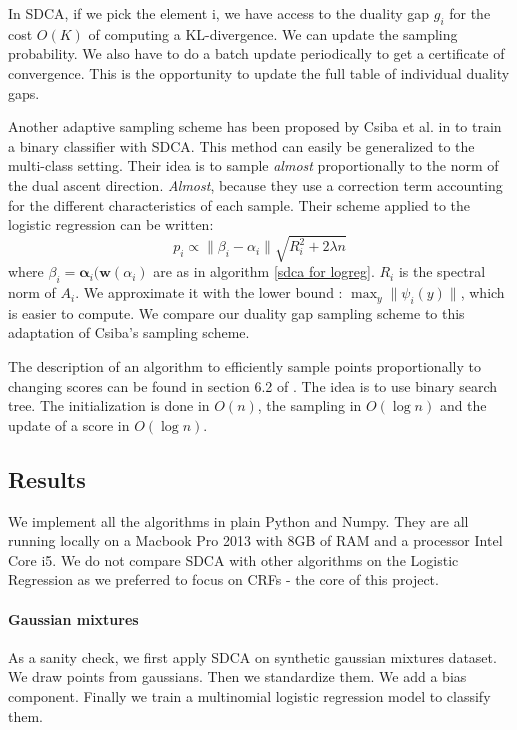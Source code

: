 \documentclass{article}
\DeclareMathOperator{\1}{\mathbb{1}}
\begin{document}
In SDCA, if we pick the element i, we have access to the duality gap $g_i$ for the cost $O(K)$ of computing a KL-divergence.
We can update the sampling probability.
We also have to do a batch update periodically to get a certificate of convergence.
This is the opportunity to update the full table of individual duality gaps.

Another adaptive sampling scheme has been proposed by Csiba et al.  in \cite{csiba_stochastic_2015} to train a binary classifier with SDCA.
This method can easily be generalized to the multi-class setting.
Their idea is to sample \textit{almost} proportionally to the norm of the dual ascent direction.
\textit{Almost}, because they use a correction term accounting for the different characteristics of each sample.
Their scheme applied to the logistic regression can be written:
\begin{equation}
	\label{csiba}
	p_i \propto \| \beta_i - \alpha_i \| \sqrt{R_i^2 + 2 \lambda n} 
\end{equation}
where $\beta_i = \bm \alpha_i(\bm w(\alpha_i)$ are as in algorithm \ref{sdca for logreg}. 
$R_i$ is the spectral norm of $A_i$.
We approximate it with the lower bound : $\max_y \| \psi_i(y)\|$, which is easier to compute.
We compare our duality gap sampling scheme to this adaptation of Csiba's sampling scheme.

The description of an algorithm to efficiently sample points proportionally to changing scores can be found in section 6.2 of \cite{nesterov_efficiency_2012}.
The idea is to use binary search tree.
The initialization is done in $O(n)$, the sampling in $O(\log n)$ and the update of a score in $O(\log n)$.

\subsection{Results}

We implement all the algorithms in plain Python and Numpy.
They are all running locally on a Macbook Pro 2013 with 8GB of RAM and a processor Intel Core i5.
We do not compare SDCA with other algorithms on the Logistic Regression as we preferred to focus on CRFs - the core of this project.

\paragraph{Gaussian mixtures}
As a sanity check, we first apply SDCA on synthetic gaussian mixtures dataset.
We draw points from gaussians.
Then we standardize them.
We add a bias component.
Finally we train a multinomial logistic regression model to classify them.
\end{document}
